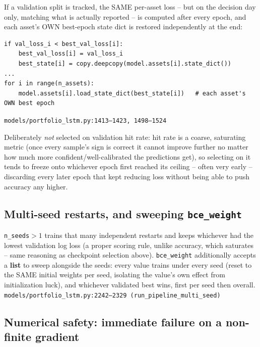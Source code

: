 \documentclass[11pt]{article}
\newcommand{\srcref}[1]{\hfill\textcolor{cmtcolor}{\footnotesize\texttt{#1}}}
\newcommand{\code}[1]{\texttt{\small #1}}
\begin{document}
If a validation split is tracked, the SAME per-asset loss -- but on the decision day only,
matching what is actually reported -- is computed after every epoch, and each asset's OWN
best-epoch state dict is restored independently at the end:
\begin{lstlisting}[caption={Per-asset validation tracking and independent checkpoint restoration.}, label=lst:checkpoint]
if val_loss_i < best_val_loss[i]:
    best_val_loss[i] = val_loss_i
    best_state[i] = copy.deepcopy(model.assets[i].state_dict())
...
for i in range(n_assets):
    model.assets[i].load_state_dict(best_state[i])   # each asset's OWN best epoch
\end{lstlisting}
\srcref{models/portfolio\_lstm.py:1413--1423, 1498--1524}

Deliberately \emph{not} selected on validation hit rate: hit rate is a coarse, saturating
metric (once every sample's sign is correct it cannot improve further no matter how much more
confident/well-calibrated the predictions get), so selecting on it tends to freeze onto
whichever epoch first reached its ceiling -- often very early -- discarding every later
epoch that kept reducing loss without being able to push accuracy any higher.

\subsection{Multi-seed restarts, and sweeping \texttt{bce\_weight}}

\code{n\_seeds}$>1$ trains that many independent restarts and keeps whichever had the lowest
validation log loss (a proper scoring rule, unlike accuracy, which saturates -- same
reasoning as checkpoint selection above). \code{bce\_weight} additionally accepts a
\textbf{list} to sweep alongside the seeds: every value trains under every seed (reset to
the SAME initial weights per seed, isolating the value's own effect from initialization
luck), and whichever validated best wins, first per seed then overall.
\srcref{models/portfolio\_lstm.py:2242--2329 (\texttt{run\_pipeline\_multi\_seed})}

\subsection{Numerical safety: immediate failure on a non-finite gradient}
\label{sec:numericalissues}
\end{document}
